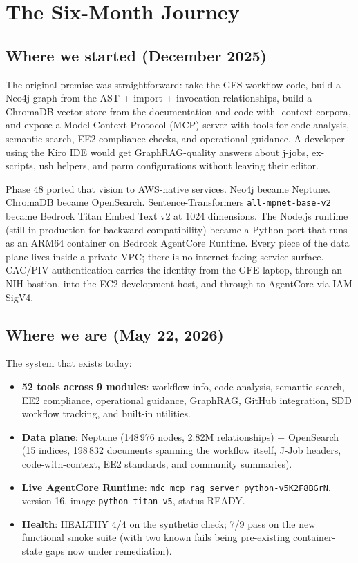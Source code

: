 \documentclass[11pt,letterpaper]{article}
\begin{document}
\section{The Six-Month Journey}

\subsection{Where we started (December 2025)}

The original premise was straightforward: take the GFS workflow code,
build a Neo4j graph from the AST + import + invocation relationships,
build a ChromaDB vector store from the documentation and code-with-
context corpora, and expose a Model Context Protocol (MCP) server with
tools for code analysis, semantic search, EE2 compliance checks, and
operational guidance. A developer using the Kiro IDE would get
GraphRAG-quality answers about j-jobs, ex-scripts, ush helpers, and
parm configurations without leaving their editor.

Phase 48 ported that vision to AWS-native services. Neo4j became
Neptune. ChromaDB became OpenSearch. Sentence-Transformers
\texttt{all-mpnet-base-v2} became Bedrock Titan Embed Text v2 at 1024
dimensions. The Node.js runtime (still in production for backward
compatibility) became a Python port that runs as an ARM64 container on
Bedrock AgentCore Runtime. Every piece of the data plane lives inside
a private VPC; there is no internet-facing service surface. CAC/PIV
authentication carries the identity from the GFE laptop, through an
NIH bastion, into the EC2 development host, and through to AgentCore
via IAM SigV4.

\subsection{Where we are (May 22, 2026)}

The system that exists today:

\begin{itemize}[leftmargin=*]
    \item \textbf{52 tools across 9 modules}: workflow info, code
    analysis, semantic search, EE2 compliance, operational guidance,
    GraphRAG, GitHub integration, SDD workflow tracking, and built-in
    utilities.
    \item \textbf{Data plane}: Neptune (148\,976 nodes, 2.82M
    relationships) + OpenSearch (15 indices, 198\,832 documents
    spanning the workflow itself, J-Job headers, code-with-context,
    EE2 standards, and community summaries).
    \item \textbf{Live AgentCore Runtime}:
    \texttt{mdc\_mcp\_rag\_server\_python-v5K2F8BGrN}, version 16,
    image \texttt{python-titan-v5}, status READY.
    \item \textbf{Health}: HEALTHY 4/4 on the synthetic check; 7/9 pass
    on the new functional smoke suite (with two known fails being
    pre-existing container-state gaps now under remediation).
\end{itemize}
\end{document}
